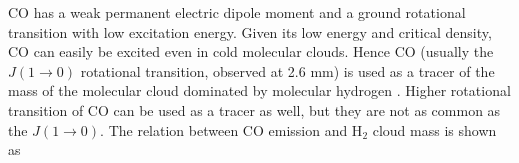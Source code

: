 \documentclass[useAMS,usenatbib]{mn2e}
\begin{document}


CO has a weak permanent electric dipole moment and a ground rotational transition with low excitation energy. Given its low energy and critical density, CO can easily be excited even in cold molecular clouds. Hence CO (usually the $J(1\rightarrow 0)$ rotational transition, observed at 2.6 mm) is used as a tracer of the mass of the molecular cloud dominated by molecular hydrogen \citep[see, for example,][] {Sanders84}. Higher rotational transition of CO can be used as a tracer as well, but they are not as common as the $J(1\rightarrow 0)$. The relation between CO emission and H$_2$ cloud mass is shown as
\end{document}
